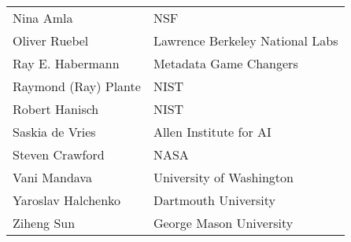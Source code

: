 \documentclass[
  number]{elsarticle}
\begin{document}
\begin{longtable}[]{@{}ll@{}}
Nina Amla & NSF \\
Oliver Ruebel & Lawrence Berkeley National Labs \\
Ray E. Habermann & Metadata Game Changers \\
Raymond (Ray) Plante & NIST \\
Robert Hanisch & NIST \\
Saskia de Vries & Allen Institute for AI \\
Steven Crawford & NASA \\
Vani Mandava & University of Washington \\
Yaroslav Halchenko & Dartmouth University \\
Ziheng Sun & George Mason University \\
\end{longtable}


\renewcommand\refname{References}
  
\end{document}

